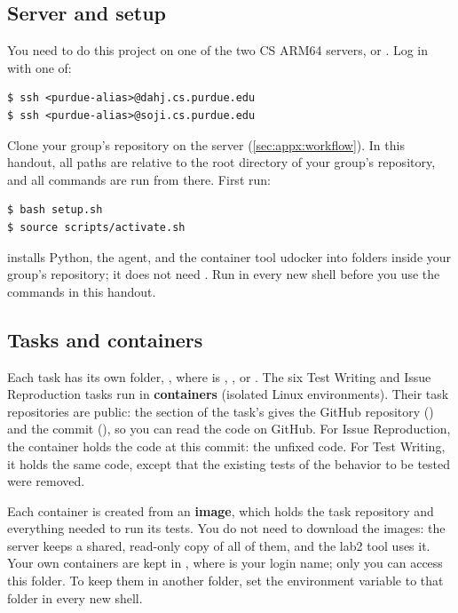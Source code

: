 \documentclass[letterpaper,11pt]{article}
\begin{document}
\subsection{Server and setup}
\label{sec:server}

You need to do this project on one of the two CS ARM64 servers,  or
. Log in with one of:

\begin{verbatim}
$ ssh <purdue-alias>@dahj.cs.purdue.edu
$ ssh <purdue-alias>@soji.cs.purdue.edu
\end{verbatim}

Clone your group's repository on the server (\autoref{sec:appx:workflow}). In
this handout, all paths are relative to the root directory of your group's
repository, and all commands are run from there. First run:

\begin{verbatim}
$ bash setup.sh
$ source scripts/activate.sh
\end{verbatim}
 installs Python, the agent, and the container tool udocker into
folders inside your group's repository; it does not need . Run
 in every new shell before you use the
commands in this handout.

\subsection{Tasks and containers}
\label{sec:tasks}

Each task has its own folder, , where 
is , , or . The six Test
Writing and Issue Reproduction tasks run in \textbf{containers} (isolated
Linux environments). Their task repositories are public: the  section of the task's  gives the GitHub repository () and the commit
(), so you can read the code on GitHub. For Issue Reproduction, the container holds
the code at this commit: the unfixed code. For Test Writing, it holds the same
code, except that the existing tests of the behavior to be tested were removed.

Each container is created from an \textbf{image}, which holds the task
repository and everything needed to run its tests. You do not need to
download the images: the server keeps a shared, read-only copy of all of
them, and the lab2 tool uses it. Your own containers are kept in
, where  is your login name;
only you can access this folder. To keep them in another folder, set the
environment variable  to that folder in every new
shell.
\end{document}
